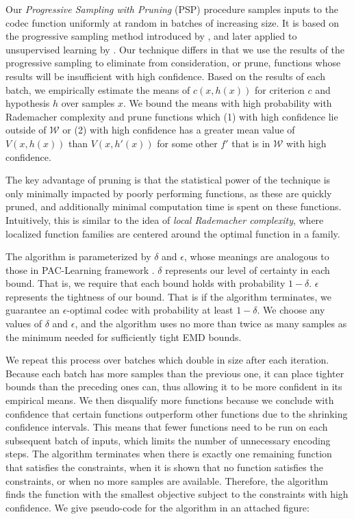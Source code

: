 \documentclass{article}
\newcommand{\cc}[1]{\textcolor{blue}{Cyrus: \textbf{#1}}}
\begin{document}
{Our \emph{Progressive Sampling with Pruning} (PSP) procedure samples inputs to the codec function uniformly at random in batches of increasing size. It is based on the progressive sampling method introduced by \citep{elomaa2002progressive}, and later applied to unsupervised learning by \citep{riondato2015mining,riondato2016abra}. Our technique differs in that we use the results of the progressive sampling to eliminate from consideration, or prune, functions whose results will be insufficient with high confidence. Based on the results of each batch, we empirically estimate the means of $c(x,h(x))$ for criterion $c$ and hypothesis $h$ over samples $x$. We bound the means with high probability with Rademacher complexity and prune functions which (1) with high confidence lie outside of $\mathcal{W}$ or (2) with high confidence has a greater mean value of $V(x,h(x))$ than $V(x,h'(x))$ for some other $f'$ that is in $\mathcal{W}$ with high confidence.

The key advantage of pruning is that the statistical power of the technique is only minimally impacted by poorly performing functions, as these are quickly pruned, and additionally minimal computation time is spent on these functions.  Intuitively, this is similar to the idea of \emph{local Rademacher complexity}, where localized function families \citep{bartlett2005local} are centered around the optimal function in a family.

The algorithm is parameterized by $\delta$ and $\epsilon$, whose meanings are analogous to those in PAC-Learning framework \citep{valiant}. $\delta$ represents our level of certainty in each bound. That is, we require that each bound holds with probability $1 - \delta$. $\epsilon$ represents the tightness of our bound. That is if the algorithm terminates, we guarantee an $\epsilon$-optimal codec with probability at least $1 - \delta$. We choose any values of $\delta$ and $\epsilon$, and the algorithm uses no more than twice as many samples as the minimum needed for sufficiently tight EMD bounds.


We repeat this process over batches which double in size after each iteration. Because each batch has more samples than the previous one, it can place tighter bounds than the preceding ones can, thus allowing it to be more confident in its empirical means. We then disqualify more functions because we conclude with confidence that certain functions outperform other functions due to the shrinking confidence intervals.  This means that fewer functions need to be run on each subsequent batch of inputs, which limits the number of unnecessary encoding steps. The algorithm terminates when there is exactly one remaining function that satisfies the constraints, when it is shown that no function satisfies the constraints, or when no more samples are available. Therefore, the algorithm finds the function with the smallest objective subject to the constraints with high confidence. We give pseudo-code for the algorithm in an attached figure:

}
\end{document}
